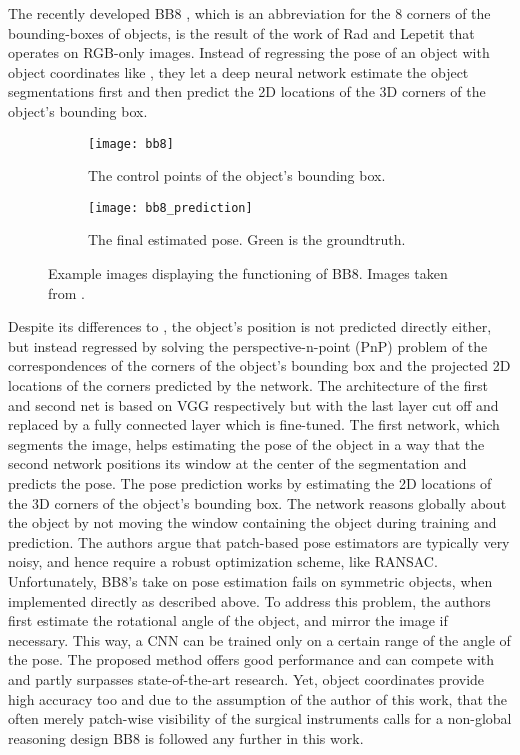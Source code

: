 The recently developed BB8 \cite{bb8}, which is an abbreviation for the 8 corners of the bounding-boxes of objects, is the result of the work of Rad and Lepetit that operates on RGB-only images. Instead of regressing the pose of an object with object coordinates like \cite{brachmann1}, they let a deep neural network estimate the object segmentations first and then predict the 2D locations of the 3D corners of the object's bounding box. 
\nnewline
\begin{figure}[!tbp]
	\centering
	\begin{subfigure}[b]{0.45\textwidth}
		\centering
    	\texttt{[image: bb8]}
    	\caption{The control points of the object's bounding box.}
	\end{subfigure}
	\hfill
	\begin{subfigure}[b]{0.45\textwidth}
		\centering
    	\texttt{[image: bb8\_prediction]}
    	\caption{The final estimated pose. Green is the groundtruth.}
	\end{subfigure}
	\caption{Example images displaying the functioning of BB8. Images taken from \cite{bb8}.}
\end{figure}
Despite its differences to \cite{brachmann1}, the object's position is not predicted directly either, but instead regressed by solving the perspective-n-point (PnP) problem of the correspondences of the corners of the object's bounding box and the projected 2D locations of the corners predicted by the network. The architecture of the first and second net is based on VGG respectively but with the last layer cut off and replaced by a fully connected layer which is fine-tuned. 
\nnewline
The first network, which segments the image, helps estimating the pose of the object in a way that the second network positions its window at the center of the segmentation and predicts the pose. The pose prediction works by estimating the 2D locations of the 3D corners of the object's bounding box. The network reasons globally about the object by not moving the window containing the object during training and prediction. The authors argue that patch-based pose estimators are typically very noisy, and hence require a robust optimization scheme, like RANSAC. 
\nnewline
Unfortunately, BB8's take on pose estimation fails on symmetric objects, when implemented directly as described above. To address this problem, the authors first estimate the rotational angle of the object, and mirror the image if necessary. This way, a CNN can be trained only on a certain range of the angle of the pose.
\nnewline
The proposed method offers good performance and can compete with and partly surpasses state-of-the-art research. Yet, object coordinates provide high accuracy too and due to the assumption of the author of this work, that the often merely patch-wise visibility of the surgical instruments calls for a non-global reasoning design BB8 is followed any further in this work.

